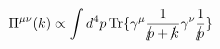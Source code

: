 \begin{equation}
\Pi^{\mu\nu}(k) \propto \int d^4p  \, {\rm Tr}\{\gamma^\mu {1
\over {{p\kern-0.15em\raise0.17ex\llap{/}\kern0.15em\relax} +
{k\kern-0.15em\raise0.17ex\llap{/}\kern0.15em\relax}}} \gamma^\nu
{1\over {{p\kern-0.15em\raise0.17ex\llap{/}\kern0.15em\relax}}}\}
\end{equation}

